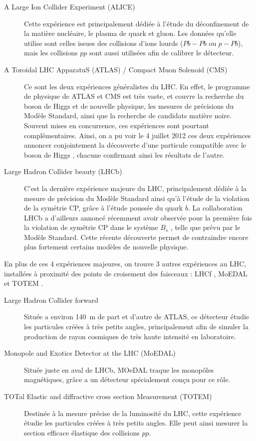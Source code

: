 \begin{description}
  \item[A Large Ion Collider Experiment (ALICE)] Cette expérience est principalement dédiée à l'étude du déconfinement de la matière nucléaire, le plasma de quark et gluon. Les données qu'elle utilise sont celles issues des collisions d'ions lourds ($Pb-Pb$ ou $p-Pb$), mais les collisions $pp$ sont aussi utilisées afin de calibrer le détecteur.
  \item[A Toroidal LHC ApparatuS (ATLAS) / Compact Muon Solenoid (CMS)] Ce sont les deux expériences généralistes du LHC. En effet, le programme de physique de ATLAS et CMS est très vaste, et couvre la recherche du boson de Higgs et de nouvelle physique, les mesures de précisions du Modèle Standard, ainsi que la recherche de candidats matière noire. Souvent mises en concurrence, ces expériences sont pourtant complémentaires. Ainsi, on a pu voir le 4 juillet 2012 ces deux expériences annoncer conjointement la découverte d'une particule compatible avec le boson de Higgs \citep{higgs_atlas,higgs_cms}, chacune confirmant ainsi les résultats de l'autre.
  \item[Large Hadron Collider beauty (LHCb)] C'est la dernière expérience majeure du LHC, principalement dédiée à la mesure de précision du Modèle Standard ainsi qu'à l'étude de la violation de la symétrie CP, grâce à l'étude poussée du quark $b$. La collaboration LHCb a d'ailleurs annoncé récemment avoir observée pour la première fois la violation de symétrie CP dans le système $B_s$ \citep{lhcb_bs}, telle que prévu par le Modèle Standard. Cette récente découverte permet de contraindre encore plus fortement certains modèles de nouvelle physique.
\end{description}

En plus de ces 4 expériences majeures, on trouve 3 autres expériences au LHC, installées à proximité des points de croisement des faisceaux : LHCf \citep{lhcf}, MoEDAL \citep{moedal} et TOTEM \citep{totem}.

\begin{description}
  \item[Large Hadron Collider forward] Située a environ \SI{140}{\m} de part et d'autre de ATLAS, ce détecteur étudie les particules créées à très petits angles, principalement afin de simuler la production de rayon cosmiques de très haute intensité en laboratoire.
  \item[Monopole and Exotics Detector at the LHC (MoEDAL)] Située juste en aval de LHCb, MOeDAL traque les monopôles magnétiques, grâce a un détecteur spécialement conçu pour ce rôle.
  \item[TOTal Elastic and diffractive cross section Measurement (TOTEM)] Destinée à la mesure précise de la luminosité du LHC, cette expérience étudie les particules créées à très petits angles. Elle peut ainsi mesurer la section efficace élastique des collisions $pp$.
\end{description}

